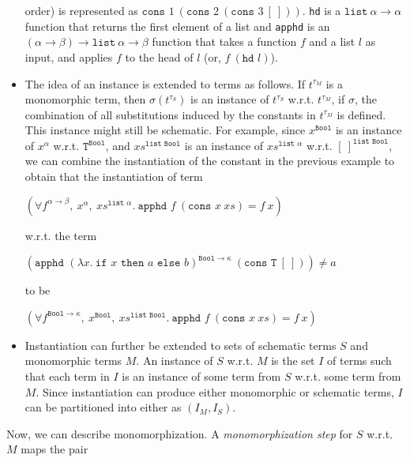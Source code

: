 \documentclass[11pt]{article}
\begin{document}
\begin{itemize}
		order) is represented as 
		$\texttt{cons }1\ (\texttt{cons }2
		\ (\texttt{cons }3\ [\ ]))$.
		\texttt{hd} is a $\texttt{list}\ 
		\alpha \to \alpha$ function that 
		returns the first element of a list 
		and \texttt{apphd} is an $(\alpha
		\to \beta) \to \texttt{list}\
		\alpha \to \beta$ function that
		takes a function $f$ and a list 
		$l$ as input, and applies $f$
		to the head of $l$ (or, $f\ 
		(\texttt{hd }l)$).
		\item The idea of an instance is 
		extended to terms as follows. If 
		$t^{\tau_M}$ is a monomorphic term, 
		then $\sigma(t^{\tau_S})$ is an instance 
		of $t^{\tau_S}$ w.r.t. $t^{\tau_M}$, if 
		$\sigma$, the combination of all 
		substitutions induced by the 
		constants in $t^{\tau_M}$ is defined. This 
		instance might still be schematic. For 
		example, since $x^{\texttt{Bool}}$ is 
		an instance of $x^{\alpha}$ w.r.t.
		$\texttt{T}^{\texttt{Bool}}$, 
		and $xs^{\texttt{list Bool}}$ is 
		an instance of 
		$xs^{\texttt{list }\alpha}$ 
		w.r.t. $[\ ]^{\texttt{list Bool}}$,
		we can combine the instantiation 
		of the constant in the previous 
		example to obtain that the 
		instantiation of term
		\begin{center}
			$(\forall f^{\alpha \to \beta},\ 
			x^{\alpha},\ xs^{\texttt{list }
				\alpha}.\ \texttt{apphd }f\ 
			(\texttt{cons }x\ xs) = f\ x)$
		\end{center}
		w.r.t. the term
		\begin{center}
			$(\texttt{apphd }(\lambda 
			x.\ \texttt{if }x\texttt{ then }
			a \texttt{ else } b)^{\texttt{Bool} 
				\to \kappa}\ (\texttt{cons T}\ 
			[\ ])) \neq a$
		\end{center}
		to be
		\begin{center}
			$(\forall f^{\texttt{Bool}
				\to \kappa},\ x^{\texttt{Bool}},
			\ xs^{\texttt{list Bool}}.\ 
			\texttt{apphd }f\ (\texttt{cons }x
			\ xs) = f\ x)$
		\end{center}
		\item Instantiation can further be 
		extended to sets of schematic 
		terms $S$ and monomorphic terms $M$. 
		An instance of $S$ w.r.t. 
		$M$ is the set $I$ of terms such 
		that each term in $I$ is an instance 
		of some term from $S$ w.r.t. 
		some term from $M$. Since 
		instantiation can produce either 
		monomorphic or schematic terms, $I$
		can be partitioned into either as
		$(I_M, I_S)$.
	\end{itemize}
	Now, we can describe monomorphization.
	A \textit{monomorphization step} for 
	$S$ w.r.t. $M$ maps the pair 
\end{document}
